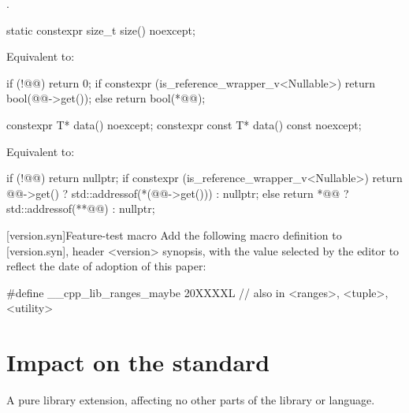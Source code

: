 \documentclass[a4paper,10pt,oneside,openany,final,article]{memoir}
\begin{document}
\begin{wording}
\begin{itemdescr}
  \pnum{}
  \returns {}.
\end{itemdescr}

\begin{itemdecl}
  static constexpr size_t size() noexcept;
\end{itemdecl}

\begin{itemdescr}
  \pnum{}
  \effects{}
  Equivalent to:

  \begin{codeblock}
    if (!@@)
    return 0;
    if constexpr (is_reference_wrapper_v<Nullable>) {
      return bool(@@->get());
    } else {
      return bool(*@@);
    }
  \end{codeblock}
\end{itemdescr}

\begin{itemdecl}
  constexpr T* data() noexcept;
  constexpr const T* data() const noexcept;
\end{itemdecl}

\begin{itemdescr}
\pnum{}
\effects{}
Equivalent to:
\begin{codeblock}
  if (!@@)
    return nullptr;
  if constexpr (is_reference_wrapper_v<Nullable>) {
    return @@->get() ? std::addressof(*(@@->get())) : nullptr;
  } else {
    return *@@ ? std::addressof(**@@) : nullptr;
  }
\end{codeblock}
\end{itemdescr}

[version.syn]{Feature-test macro}
Add the following macro definition to [version.syn], header <version> synopsis, with the value selected by the editor to reflect the date of adoption of this paper:

\begin{codeblock}
  #define __cpp_lib_ranges_maybe 20XXXXL // also in <ranges>, <tuple>, <utility>
\end{codeblock}

\end{wording}

\chapter{Impact on the standard}

A pure library extension, affecting no other parts of the library or language.
\end{document}
